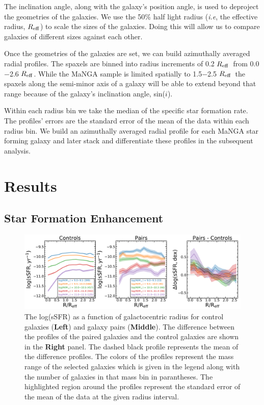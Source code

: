 \documentclass[iop,revtex4,twocolumn,apj,numberedappendix,appendixfloats]{emulateapj}
\newcommand{\reff}{$R_{\rm eff}$}
\begin{document}
The inclination angle, along with the galaxy's position angle, is used to deproject the geometries of the galaxies. We use the 50\% half light radius ({\it i.e}, the effective radius, \reff) to scale the sizes of the galaxies. Doing this will allow us to compare galaxies of different sizes against each other.

Once the geometries of the galaxies are set, we can build azimuthally averaged radial profiles. The spaxels are binned into radius increments of 0.2 \reff\ from 0.0$-$2.6 \reff. While the MaNGA sample is limited spatially to 1.5$-$2.5 \reff\, the spaxels along the semi-minor axis of a galaxy will be able to extend beyond that range because of the galaxy's inclination angle, sin($i$). 

Within each radius bin we take the median of the specific star formation rate. The profiles' errors are the standard error of the mean of the data within each radius bin. We build an azimuthally averaged radial profile for each MaNGA star forming galaxy and later stack and differentiate these profiles in the subsequent analysis. 

\section{Results}\label{sec:results}

\subsection{Star Formation Enhancement}

\begin{figure}
\centering
\includegraphics[width=\linewidth]{fig/ssfr_comb.pdf}
\caption[]{The log(sSFR) as a function of galactocentric radius for control galaxies (\textbf{Left}) and galaxy pairs (\textbf{Middle}). The difference between the profiles of the paired galaxies and the control galaxies are shown in the \textbf{Right} panel. The dashed black profile represents the mean of the difference profiles. The colors of the profiles represent the mass range of the selected galaxies which is given in the legend along with the number of galaxies in that mass bin in parantheses. The highlighted region around the profiles represent the standard error of the mean of the data at the given radius interval. }
\label{fig:ssfr_prof}
\end{figure}
\end{document}
